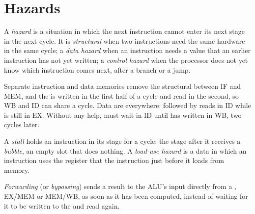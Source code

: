 \label{lst:b2:processor-and-pipelining:schedule}

\section{Hazards}\label{sec:b2:processor-and-pipelining:hazards}

\begin{definition}\label{def:b2:processor-and-pipelining:hazard}
A \emph{hazard} is a situation in which the next instruction cannot enter its next stage in
the next cycle. It is \emph{structural} when two instructions need the same hardware in the same cycle; a \emph{data
hazard} when an instruction needs a value that an earlier instruction has not yet written; a \emph{control hazard}
when the processor does not yet know which instruction comes next, after a branch or a jump.
\end{definition}

Separate instruction and data memories remove the structural  between IF and MEM, and the  is
written in the first half of a cycle and read in the second, so WB and ID can share a cycle. Data  are
everywhere:  followed by  reads  in ID while  is still
in EX. Without any help,  must wait in ID until  has written  in WB, two cycles later.

\begin{definition}\label{def:b2:processor-and-pipelining:stall}
A \emph{stall} holds an instruction in its stage for a cycle; the stage after it receives a
\emph{bubble}, an empty slot that does nothing. A \emph{load-use hazard} is a data  in which an instruction uses the register that the instruction just before it loads from
memory.
\end{definition}

\begin{definition}[Forwarding]\label{def:b2:processor-and-pipelining:forwarding}
\emph{Forwarding} (or \emph{bypassing}) sends a result to the ALU's input
directly from a , EX/MEM or MEM/WB, as soon as it has been computed, instead of waiting for it to be
written to the  and read again.
\end{definition}

